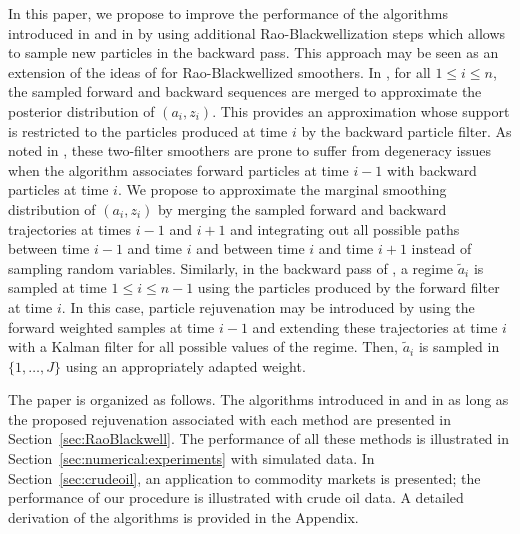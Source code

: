 \documentclass[nolayout]{article}
\theoremstyle{plain}
\theoremstyle{definition}
\newcommand{\1}{\mathbbm{1}}
\begin{document}
In this paper, we propose to improve the performance of the algorithms introduced in \cite{briers:doucet:maskell:2010} and in \cite{sarkka:bunch:godsill:2012,lindsten:bunch:godsill:schon:2013,lindsten:bunch:sarkka:schon:godsill:2015} by using additional Rao-Blackwellization steps which allows to sample new particles in the backward pass. This approach may be seen as an extension of the ideas of \cite{fearnhead:clifford:2003} for Rao-Blackwellized smoothers.  In \cite{briers:doucet:maskell:2010}, for all $1\le i\le n$, the sampled forward and backward sequences are merged to approximate the posterior distribution of $(a_i,z_i)$. This provides an approximation whose support is restricted to the particles produced at time $i$ by the backward particle filter. As noted in \cite[Secion~2.6]{fearnhead:wyncoll:tawn:2010}, these two-filter smoothers are prone to suffer from degeneracy issues when the algorithm associates forward particles at time $i-1$ with backward particles at time $i$. We propose to approximate the marginal smoothing distribution of $(a_i,z_i)$ by merging the sampled forward and backward trajectories at times $i-1$ and $i+1$ and integrating out all possible paths between time $i-1$ and time $i$ and between time $i$ and time $i+1$ instead of sampling random variables. Similarly, in the backward pass of \cite{sarkka:bunch:godsill:2012,lindsten:bunch:godsill:schon:2013,lindsten:bunch:sarkka:schon:godsill:2015}, a regime $\tilde{a}_i$ is sampled at time $1\le i\le n-1$ using the particles produced by the forward filter at time $i$. In this case, particle rejuvenation may be introduced by using the forward weighted samples at time $i-1$ and extending these trajectories at time $i$ with a Kalman filter for all possible values of the regime. Then, $\tilde{a}_i$ is sampled in $\{1,\ldots,J\}$ using an appropriately adapted weight.

The paper is organized as follows. The algorithms introduced in \cite{briers:doucet:maskell:2010} and in \cite{sarkka:bunch:godsill:2012,lindsten:bunch:godsill:schon:2013,lindsten:bunch:sarkka:schon:godsill:2015} as long as the proposed rejuvenation associated with each method are presented in Section~\ref{sec:RaoBlackwell}. The performance of all these methods is illustrated in Section~\ref{sec:numerical:experiments} with simulated data. In Section~\ref{sec:crudeoil}, an application to commodity markets is presented; the performance of our procedure is illustrated with crude oil  data. A detailed derivation of the algorithms is provided in the Appendix.
\end{document}

